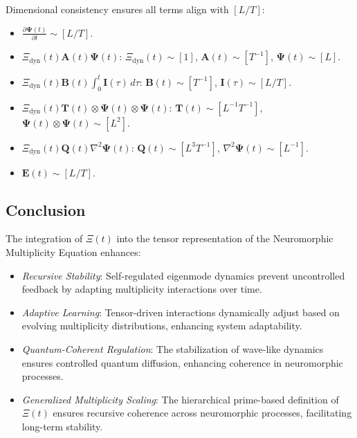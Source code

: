 \documentclass{article}
\theoremstyle{plain}
\begin{document}
Dimensional consistency ensures all terms align with \( [L/T] \):

\begin{itemize}
    \item \( \frac{\partial \bm{\Psi}(t)}{\partial t} \sim [L/T] \).
    \item \( \Xi_{\text{dyn}}(t) \bm{A}(t) \bm{\Psi}(t) \): \( \Xi_{\text{dyn}}(t) \sim [1] \), \( \bm{A}(t) \sim [T^{-1}] \), \( \bm{\Psi}(t) \sim [L] \).
    \item \( \Xi_{\text{dyn}}(t) \bm{B}(t) \int_0^t \bm{I}(\tau) \, d\tau \): \( \bm{B}(t) \sim [T^{-1}] \), \( \bm{I}(\tau) \sim [L/T] \).
    \item \( \Xi_{\text{dyn}}(t) \bm{T}(t) \otimes \bm{\Psi}(t) \otimes \bm{\Psi}(t) \): \( \bm{T}(t) \sim [L^{-1} T^{-1}] \), \( \bm{\Psi}(t) \otimes \bm{\Psi}(t) \sim [L^2] \).
    \item \( \Xi_{\text{dyn}}(t) \bm{Q}(t) \nabla^2 \bm{\Psi}(t) \): \( \bm{Q}(t) \sim [L^3 T^{-1}] \), \( \nabla^2 \bm{\Psi}(t) \sim [L^{-1}] \).
    \item \( \bm{E}(t) \sim [L/T] \).
\end{itemize}

\subsection{Conclusion}

The integration of \(\Xi(t) \) into the tensor representation of the Neuromorphic Multiplicity Equation enhances:

\begin{itemize}
    \item \textit{Recursive Stability}: Self-regulated eigenmode dynamics prevent uncontrolled feedback by adapting multiplicity interactions over time.
    \item \textit{Adaptive Learning}: Tensor-driven interactions dynamically adjust based on evolving multiplicity distributions, enhancing system adaptability.
    \item \textit{Quantum-Coherent Regulation}: The stabilization of wave-like dynamics ensures controlled quantum diffusion, enhancing coherence in neuromorphic processes.
    \item \textit{Generalized Multiplicity Scaling}: The hierarchical prime-based definition of \(\Xi(t) \) ensures recursive coherence across neuromorphic processes, facilitating long-term stability.
\end{itemize}
\end{document}
